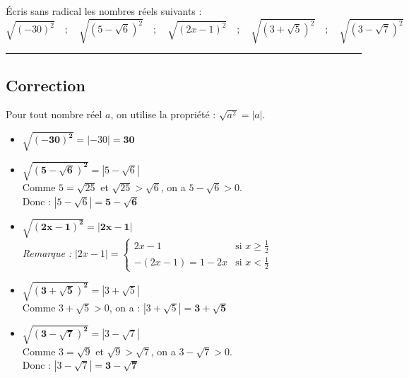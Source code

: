 \documentclass[12pt,a4paper]{article}
\begin{document}
Écris sans radical les nombres réels suivants :
\[
\sqrt{(-30)^2} \quad ; \quad \sqrt{(5 - \sqrt{6})^2} \quad ; \quad \sqrt{(2x - 1)^2} \quad ; \quad \sqrt{(3 + \sqrt{5})^2} \quad ; \quad \sqrt{(3 - \sqrt{7})^2}
\]

\vspace{0.3cm}
\hrule
\vspace{0.3cm}

\subsection*{\color{myred} Correction}

Pour tout nombre réel $a$, on utilise la propriété : $\sqrt{a^2} = |a|$.

\begin{itemize}
    \item $\mathbf{\sqrt{(-30)^2}} = |-30| = \mathbf{30}$
    
    \item $\mathbf{\sqrt{(5 - \sqrt{6})^2}} = |5 - \sqrt{6}|$ \\
    Comme $5 = \sqrt{25}$ et $\sqrt{25} > \sqrt{6}$, on a $5 - \sqrt{6} > 0$. \\
    Donc : $|5 - \sqrt{6}| = \mathbf{5 - \sqrt{6}}$
    
    \item $\mathbf{\sqrt{(2x - 1)^2}} = \mathbf{|2x - 1|}$ \\
    \textit{Remarque :} $|2x - 1| = \begin{cases} 2x - 1 & \text{si } x \ge \frac{1}{2} \\ -(2x - 1) = 1 - 2x & \text{si } x < \frac{1}{2} \end{cases}$
    
    \item $\mathbf{\sqrt{(3 + \sqrt{5})^2}} = |3 + \sqrt{5}|$ \\
    Comme $3 + \sqrt{5} > 0$, on a : $|3 + \sqrt{5}| = \mathbf{3 + \sqrt{5}}$
    
    \item $\mathbf{\sqrt{(3 - \sqrt{7})^2}} = |3 - \sqrt{7}|$ \\
    Comme $3 = \sqrt{9}$ et $\sqrt{9} > \sqrt{7}$, on a $3 - \sqrt{7} > 0$. \\
    Donc : $|3 - \sqrt{7}| = \mathbf{3 - \sqrt{7}}$
\end{itemize}
\end{document}
